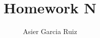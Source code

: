 \documentclass{article}
\title{Homework N}
\author{Asier Garcia Ruiz}
\begin{document}
\maketitle

\newenvironment{question}[2]
{
    {\large \textbf{Question #1.}}\\
    #2\\\\
}{\newpage}
\end{document}

